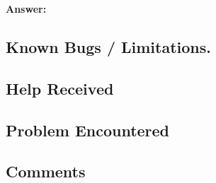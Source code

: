 \documentclass[11pt,a4paper,notitlepage]{article}
\newcommand{\explanation}[1]{}  %
\begin{document}
\textbf{Answer:} 
 
\subsection{Known Bugs / Limitations.}

\subsection{Help Received}
\explanation{
Describe whatever help (if any) that you received.
Don't include readings, lectures, and classes, but do
include any help from people (including course staff, lab TAs,
classmates, and friends) and attribute them by name.}


\subsection{Problem Encountered}
\explanation{
Describe any serious problems you encountered.                    }



\subsection{Comments}
\explanation{
List any other comments here. Feel free to provide any feedback   
on how much you learned from doing the assignment, and whether    
you enjoyed doing it.}
\end{document}

